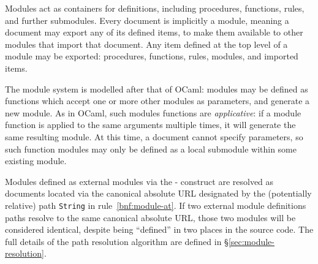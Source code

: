 Modules act as containers for definitions, including procedures,
functions, rules, and further submodules. Every \Trilogy{} document is
implicitly a module, meaning a document may export any of its defined items,
to make them available to other modules that import that document. Any item
defined at the top level of a module may be exported: procedures, functions,
rules, modules, and imported items.

The \Trilogy{} module system is modelled after that of OCaml: modules may
be defined as functions which accept one or more other modules as parameters,
and generate a new module. As in OCaml, such modules functions are \emph{applicative}:
if a module function is applied to the same arguments multiple times, it will
generate the same resulting module. At this time, a document cannot specify
parameters, so such function modules may only be defined as a local submodule
within some existing module.

Modules defined as external modules via the - construct
are resolved as documents located via the canonical absolute URL designated
by the (potentially relative) path \texttt{String} in rule~\ref{bnf:module-at}.
If two external module definitions paths resolve to the same canonical absolute
URL, those two modules will be considered identical, despite being ``defined''
in two places in the source code. The full details of the path resolution
algorithm are defined in \S\ref{sec:module-resolution}.

